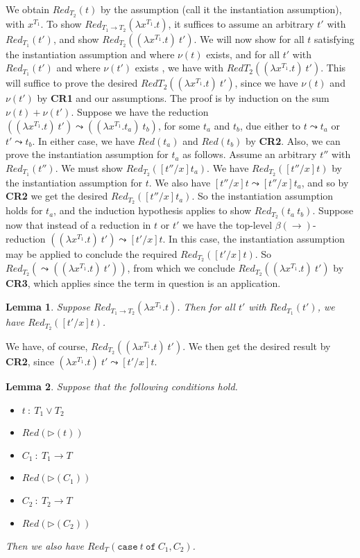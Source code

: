 \documentclass{article}
\newcommand{\red}[0]{\textit{Red}}
\newcommand{\redsub}[1]{\textit{Red}(\rhd(#1))}
\newtheorem{lemma}{Lemma}
\begin{document}
\noindent We obtain $\red_{T_2}(t)$ by the assumption (call it the
instantiation assumption), with $x^{T_1}$.  To show $\red_{T_1\to
T_2}(\lambda x^{T_1}.t)$, it suffices to assume an arbitrary $t'$ with
$\red_{T_1}(t')$, and show $\red_{T_2}((\lambda x^{T_1}.t)\ t')$.  We
will now show for all $t$ satisfying the instantiation assumption and
where $\nu(t)$ exists, and for all $t'$ with $\red_{T_1}(t')$ and
where $\nu(t')$ exists , we have with $\red{T_2}((\lambda x^{T_1}.t)\
t')$.  This will suffice to prove the desired $\red{T_2}((\lambda
x^{T_1}.t)\ t')$, since we have $\nu(t)$ and $\nu(t')$ by \textbf{CR1}
and our assumptions.  The proof is by induction on the sum
$\nu(t)+\nu(t')$.  Suppose we have the reduction $((\lambda
x^{T_1}.t)\ t')\leadsto ((\lambda x^{T_1}. t_a)\ t_b)$, for some $t_a$
and $t_b$, due either to $t\leadsto t_a$ or $t' \leadsto t_b$.  In
either case, we have $\red(t_a)$ and $\red(t_b)$ by \textbf{CR2}.
Also, we can prove the instantiation assumption for $t_a$ as follows.
Assume an arbitrary $t''$ with $\red_{T_1}(t'')$.  We must show
$\red_{T_2}([t''/x]t_a)$.  We have $\red_{T_2}([t''/x]t)$ by the
instantiation assumption for $t$.  We also have $[t''/x]t \leadsto
[t''/x]t_a$, and so by \textbf{CR2} we get the desired
$\red_{T_2}([t''/x]t_a)$.  So the instantiation assumption holds for
$t_a$, and the induction hypothesis applies to show $\red_{T_2}(t_a\
t_b)$.  Suppose now that instead of a reduction in $t$ or $t'$ we have
the top-level $\beta(\to)$-reduction $((\lambda x^{T_1}.t)\ t')\leadsto
[t'/x]t$.  In this case, the instantiation assumption may be applied
to conclude the required $\red_{T_2}([t'/x]t)$.  So
$\red_{T_2}(\leadsto((\lambda x^{T_1}.t)\ t'))$, from which we
conclude $\red_{T_2}((\lambda x^{T_1}.t)\ t')$ by \textbf{CR3}, which
applies since the term in question is an application.

\begin{lemma}
\label{lem:red-inst}
Suppose $\red_{T_1\to T_2}(\lambda x^{T_1}.t)$.  Then for all
$t'$ with $\red_{T_1}(t')$, we have $\red_{T_2}([t'/x]t)$.
\end{lemma}

\noindent We have, of course, $\red_{T_2}((\lambda x^{T_1}.t)\ t')$.
We then get the desired result by \textbf{CR2}, since $(\lambda
x^{T_1}.t)\ t'\leadsto [t'/x]t$.

\begin{lemma}
Suppose that the following conditions hold.
\begin{itemize} 
\item $t\ :\ T_1\vee T_2$
\item $\redsub{t}$
\item $C_1\ :\ T_1\to T$
\item $\redsub{C_1}$
\item $C_2\ :\ T_2\to T$
\item $\redsub{C_2}$
\end{itemize}
Then we also have $\red_{T}(\texttt{case}\ t\ \texttt{of}\ C_1,C_2)$.
\end{lemma}
\end{document}
